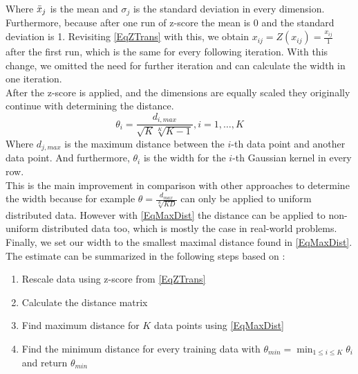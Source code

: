 Where $\bar{x}_j$ is the mean and $\sigma_j$ is the standard deviation in every dimension.\\
Furthermore, because after one run of z-score the mean is 0 and the standard deviation is 1.\cite{Mohamad.2013}
Revisiting \eqref{EqZTrans} with this, we obtain $x_{ij} = Z(x_{ij}) = \frac{x_{ij}}{1}$ after the first run, which is the same for every following iteration.
With this change, we omitted the need for further iteration and can calculate the width in one iteration.\\
After the z-score is applied, and the dimensions are equally scaled they originally continue with determining the distance.\cite{Kitayama.2011}
\begin{equation}\label{EqMaxDist}
	\theta_i = \frac{d_{i,max}}{\sqrt{K}\sqrt[K]{K-1}}, i=1,\dots,K
\end{equation}
Where $d_{j,max}$ is the maximum distance between the $i$-th data point and another data point.
And furthermore, $\theta_i$ is the width for the $i$-th Gaussian kernel in every row.\\
This is the main improvement in comparison with other approaches to determine the width because for example $\theta =\frac{d_{max}}{\sqrt[K]{KD}}$ can only be applied to uniform distributed data.
However with \eqref{EqMaxDist} the distance can be applied to non-uniform distributed data too, which is mostly the case in real-world problems.\cite{Kitayama.2011}\newline
Finally, we set our width to the smallest maximal distance found in \eqref{EqMaxDist}.
The estimate can be summarized in the following steps based on \cite{Kitayama.2011}:
\begin{enumerate}[label=\bfseries Step \arabic*:,leftmargin=*,labelindent=1em]
	\item Rescale data using z-score from \eqref{EqZTrans}
	\item Calculate the distance matrix
	\item Find maximum distance for $K$ data points using \eqref{EqMaxDist}
	\item Find the minimum distance for every training data with $\displaystyle\theta_{min}=\min_{1 \le i \le K}\theta_i$ and return $\theta_{min}$
\end{enumerate}
